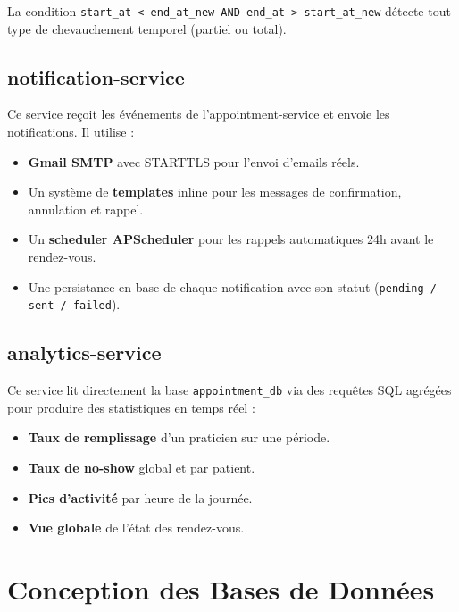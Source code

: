 \documentclass[12pt,a4paper]{article}
\begin{document}
La condition \texttt{start\_at < end\_at\_new AND end\_at > start\_at\_new} détecte tout type de chevauchement temporel (partiel ou total).

\subsection{notification-service}

Ce service reçoit les événements de l'appointment-service et envoie les notifications. Il utilise :
\begin{itemize}
  \item \textbf{Gmail SMTP} avec STARTTLS pour l'envoi d'emails réels.
  \item Un système de \textbf{templates} inline pour les messages de confirmation, annulation et rappel.
  \item Un \textbf{scheduler APScheduler} pour les rappels automatiques 24h avant le rendez-vous.
  \item Une persistance en base de chaque notification avec son statut (\texttt{pending / sent / failed}).
\end{itemize}

\subsection{analytics-service}

Ce service lit directement la base \texttt{appointment\_db} via des requêtes SQL agrégées pour produire des statistiques en temps réel :

\begin{itemize}
  \item \textbf{Taux de remplissage} d'un praticien sur une période.
  \item \textbf{Taux de no-show} global et par patient.
  \item \textbf{Pics d'activité} par heure de la journée.
  \item \textbf{Vue globale} de l'état des rendez-vous.
\end{itemize}

\section{Conception des Bases de Données}
\end{document}
